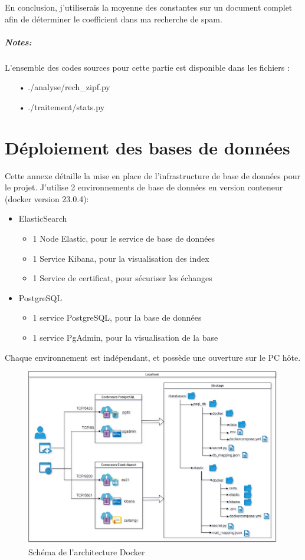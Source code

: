 \documentclass[a4paper,12pt]{article}
\begin{document}
		En conclusion, j'utiliserais la moyenne des constantes sur un document complet afin de déterminer le coefficient dans ma recherche de spam. 
		
		\subparagraph{Notes:}
			L'ensemble des codes sources pour cette partie est disponible dans les fichiers :
			\begin{itemize}
				\item[•]./analyse/rech\_zipf.py
				\item[•] ./traitement/stats.py
			\end{itemize}

\newpage
\section{Déploiement des bases de données}	
	Cette annexe détaille la mise en place de l'infrastructure de base de données pour le projet.
	J'utilise 2 environnements de base de données en version conteneur (docker version 23.0.4):
		\begin{itemize}
			\item ElasticSearch
				\begin{itemize}
					\item 1 Node Elastic, pour le service de base de données
					\item 1 Service Kibana, pour la visualisation des index
					\item 1 Service de certificat, pour sécuriser les échanges
				\end{itemize}
			\item PostgreSQL
				\begin{itemize}
					\item 1 service PostgreSQL, pour la base de données
					\item 1 service PgAdmin, pour la visualisation de la base
				\end{itemize}
		\end{itemize}
		
	Chaque environnement est indépendant, et possède une ouverture sur le PC hôte.
	
	
	\begin{figure}[H]
		\includegraphics[width=\linewidth]{img/SchemaDocker.jpg}
		\caption{Schéma de l'architecture Docker}
	\end{figure}
	
\end{document}
